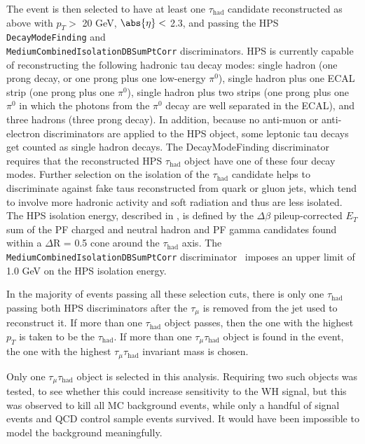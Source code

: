 The event is then selected to have at least one $\tau_{\text{had}}$ candidate reconstructed as above with $p_T >$ 20 GeV, $\abs{\eta} <$ 2.3, and passing the HPS \texttt{DecayModeFinding} and \texttt{\\MediumCombinedIsolationDBSumPtCorr} discriminators. HPS is currently capable of reconstructing the following hadronic tau decay modes: single hadron (one prong decay, or one prong plus one low-energy $\pi^0$), single hadron plus one ECAL strip (one prong plus one $\pi^0$), single hadron plus two strips (one prong plus one $\pi^0$ in which the photons from the $\pi^0$ decay are well separated in the ECAL), and three hadrons (three prong decay). In addition, because no anti-muon or anti-electron discriminators are applied to the HPS object, some leptonic tau decays get counted as single hadron decays.  The DecayModeFinding discriminator requires that the reconstructed HPS $\tau_{\text{had}}$ object have one of these four decay modes. Further selection on the isolation of the $\tau_{\text{had}}$ candidate helps to discriminate against fake taus reconstructed from quark or gluon jets, which tend to involve more hadronic activity and soft radiation and thus are less isolated.  The HPS isolation energy, described in \cite{CMS_AN_2010-082}, is defined by the $\Delta\beta$ pileup-corrected $E_T$ sum of the PF charged and neutral hadron and PF gamma candidates found within a $\Delta$R = 0.5 cone around the $\tau_{\text{had}}$ axis.  The \texttt{MediumCombinedIsolationDBSumPtCorr} discriminator~\cite{CMS:tauidtwiki} imposes an upper limit of 1.0 GeV on the HPS isolation energy.

In the majority of events passing all these selection cuts, there is only one $\tau_{\text{had}}$ passing both HPS discriminators after the $\tau_{\mu}$ is removed from the jet used to reconstruct it. If more than one $\tau_{\text{had}}$ object passes, then the one with the highest $p_T$ is taken to be the $\tau_{\text{had}}$. If more than one $\tau_{\mu}\tau_{\text{had}}$ object is found in the event, the one with the highest $\tau_{\mu}\tau_{\text{had}}$ invariant mass is chosen.

Only one $\tau_{\mu}\tau_{\text{had}}$ object is selected in this analysis. Requiring two such objects was tested, to see whether this could increase sensitivity to the WH signal, but this was observed to kill all MC background events, while only a handful of signal events and QCD control sample events survived.  It would have been impossible to model the background meaningfully.

